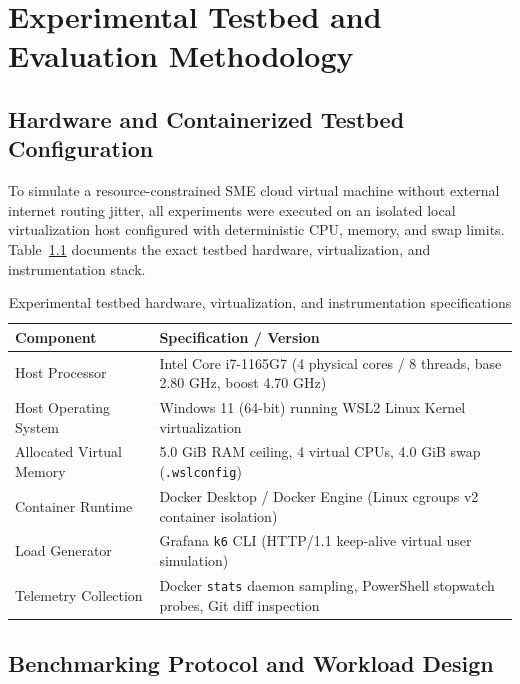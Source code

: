\chapter{Experimental Testbed and Evaluation Methodology}
\label{chap:empirical}

\section{Hardware and Containerized Testbed Configuration}
\label{sec:testbed}

To simulate a resource-constrained SME cloud virtual machine without external internet routing jitter, all experiments were executed on an isolated local virtualization host configured with deterministic CPU, memory, and swap limits. Table~\ref{tab:env-specs} documents the exact testbed hardware, virtualization, and instrumentation stack.

\begin{table}[h]
  \caption{Experimental testbed hardware, virtualization, and instrumentation specifications}
  \label{tab:env-specs}
  \centering
  \begin{tabular}{p{4.4cm}p{9.6cm}}
    \toprule
    \textbf{Component} & \textbf{Specification / Version} \\
    \midrule
    Host Processor & Intel Core i7-1165G7 (4 physical cores / 8 threads, base 2.80 GHz, boost 4.70 GHz) \\
    Host Operating System & Windows 11 (64-bit) running WSL2 Linux Kernel virtualization \\
    Allocated Virtual Memory & 5.0 GiB RAM ceiling, 4 virtual CPUs, 4.0 GiB swap (\texttt{.wslconfig}) \\
    Container Runtime & Docker Desktop / Docker Engine (Linux cgroups v2 container isolation) \\
    Load Generator & Grafana \texttt{k6} CLI (HTTP/1.1 keep-alive virtual user simulation) \\
    Telemetry Collection & Docker \texttt{stats} daemon sampling, PowerShell stopwatch probes, Git diff inspection \\
    \bottomrule
  \end{tabular}
\end{table}

\section{Benchmarking Protocol and Workload Design}
\label{sec:benchmark-protocol}

